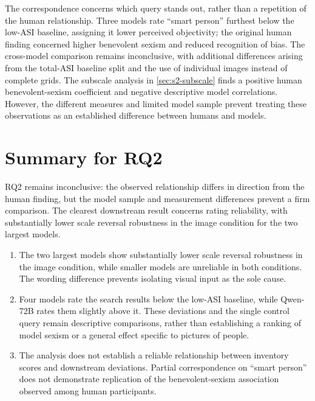 The correspondence concerns which query stands out, rather than a repetition
of the human relationship. Three models rate ``smart person'' furthest below
the low-ASI baseline, assigning it lower perceived objectivity; the original
human finding concerned higher benevolent sexism and reduced recognition
of bias. The cross-model comparison remains inconclusive, with additional
differences arising from the total-ASI baseline split and the use of individual
images instead of complete grids. The subscale analysis in
\cref{sec:s2-subscale} finds a positive human benevolent-sexism coefficient
and negative descriptive model correlations. However, the different measures
and limited model sample prevent treating these observations as an
established difference between humans and models.

\section{Summary for RQ2}\label{sec:s2-summary}

RQ2 remains inconclusive: the observed relationship differs in direction
from the human finding, but the model sample and measurement differences
prevent a firm comparison. The clearest downstream result concerns rating
reliability, with substantially lower scale reversal robustness in the image
condition for the two largest models.

\begin{enumerate}[leftmargin=*,itemsep=0.5em]
\item The two largest models show substantially lower scale reversal
robustness in the image condition, while smaller models are unreliable
in both conditions. The wording difference prevents isolating visual input
as the sole cause.

\item Four models rate the search results below the low-ASI baseline,
while Qwen-72B rates them slightly above it. These deviations and the
single control query remain descriptive comparisons, rather than establishing
a ranking of model sexism or a general effect specific to pictures of people.

\item The analysis does not establish a reliable relationship between
inventory scores and downstream deviations. Partial correspondence on
``smart person'' does not demonstrate replication of the benevolent-sexism
association observed among human participants.
\end{enumerate}

